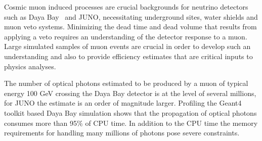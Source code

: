 \documentclass[a4paper]{jpconf}
\begin{document}

Cosmic muon induced processes are crucial backgrounds for neutrino
detectors such as Daya Bay~\cite{dyb} and JUNO\cite{juno}, 
necessitating underground sites, water shields and muon veto systems\cite{dybmuon}.
Minimizing the dead time and dead volume that results from applying 
a veto requires an understanding of the detector response to a muon.
Large simulated samples of muon events are crucial in order to 
develop such an understanding and also to provide efficiency estimates 
that are critical inputs to physics analyses.

The number of optical photons estimated to be produced by a muon of 
typical energy 100 GeV crossing the Daya Bay detector is at the level of several millions, 
for JUNO the estimate is an order of magnitude larger. 
Profiling the Geant4 toolkit based Daya Bay simulation 
shows that the propagation of optical photons consumes more than 95\% of CPU time. 
In addition to the CPU time the memory requirements for handling many millions 
of photons pose severe constraints.  

%
%
\end{document}
